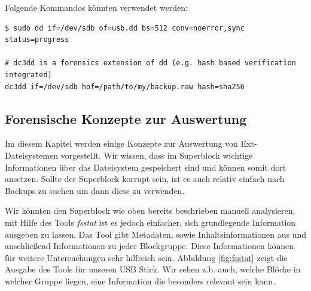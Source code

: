 Folgende Kommandos könnten verwendet werden:

\begin{lstlisting}
$ sudo dd if=/dev/sdb of=usb.dd bs=512 conv=noerror,sync status=progress

# dc3dd is a forensics extension of dd (e.g. hash based verification integrated)
dc3dd if=/dev/sdb hof=/path/to/my/backup.raw hash=sha256

\end{lstlisting}


\subsection{Forensische Konzepte zur Auswertung}

Im diesem Kapitel werden einige Konzepte zur Auswertung von Ext-Dateisystemen vorgestellt. Wir wissen, dass im Superblock wichtige Informationen über das Dateisystem gespeichert sind und können somit dort ansetzen. Sollte der Superblock korrupt sein, ist es auch relativ einfach nach Backups zu suchen um dann diese zu verwenden.

Wir könnten den Superblock wie oben bereits beschrieben manuell analysieren, mit Hilfe des Tools \textit{fsstat} ist es  jedoch einfacher, sich grundlegende Information ausgeben zu lassen. Das Tool gibt Metadaten, sowie Inhaltsinformationen aus und anschließend Informationen zu jeder Blockgruppe. Diese Informationen können für weitere Untersuchungen sehr hilfreich sein. Abbildung \ref{fig:fsstat} zeigt die Ausgabe des Tools für unseren USB Stick. Wir sehen z.b. auch, welche Blöcke in welcher Gruppe liegen, eine Information die besonders relevant sein kann.

